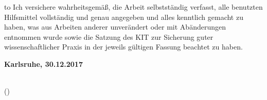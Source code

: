 
\thispagestyle{empty}
\null\vfill
\noindent\hbox to \textwidth{\hrulefill} 
%
{Ich versichere wahrheitsgemäß, die Arbeit selbstständig verfasst, alle benutzten Hilfsmittel vollständig und genau angegeben und alles kenntlich gemacht zu haben, was aus Arbeiten anderer unverändert oder mit Abänderungen entnommen wurde sowie die Satzung des KIT zur Sicherung guter wissenschaftlicher Praxis in der jeweils gültigen Fassung beachtet zu haben.}
 
 
\textbf{Karlsruhe, 30.12.2017}
\vspace{1.5cm}
 
\dotfill\hspace*{8.0cm}\\
\hspace*{2cm}(\theauthor) 
\cleardoublepage